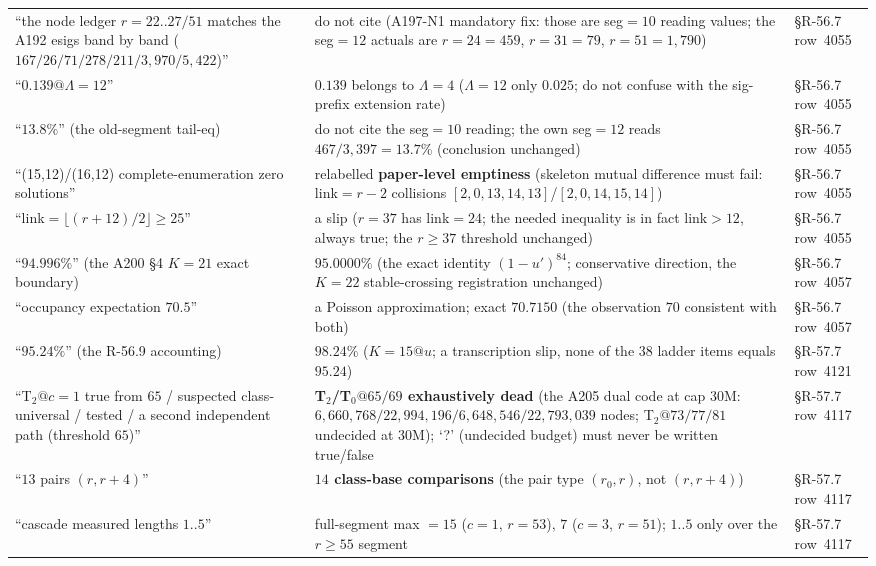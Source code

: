 \begin{longtable}{p{}p{}p{}}
``the node ledger $r=22..27/51$ matches the A192 esigs band by band ($167/26/71/278/211/3{,}970/5{,}422$)'' & do not cite (A197-N1 mandatory fix: those are seg$=10$ reading values; the seg$=12$ actuals are $r=24=$\textbf{$459$}, $r=31=$\textbf{$79$}, $r=51=$\textbf{$1{,}790$}) & \S R-56.7 row~4055 \\
``$0.139@\Lambda=12$'' & $0.139$ belongs to \textbf{$\Lambda=4$} ($\Lambda=12$ only $0.025$; do not confuse with the sig-prefix extension rate) & \S R-56.7 row~4055 \\
``$13.8\%$'' (the old-segment tail-eq) & do not cite the seg$=10$ reading; the own seg$=12$ reads \textbf{$467/3{,}397=13.7\%$} (conclusion unchanged) & \S R-56.7 row~4055 \\
``(15,12)/(16,12) complete-enumeration zero solutions'' & relabelled \textbf{paper-level emptiness} (skeleton mutual difference must fail: link$=r-2$ collisions $[2,0,13,14,13]$/$[2,0,14,15,14]$) & \S R-56.7 row~4055 \\
``link$=\lfloor(r+12)/2\rfloor\ge25$'' & a slip ($r=37$ has link$=$\textbf{$24$}; the needed inequality is in fact link$>12$, always true; the $r\ge37$ threshold unchanged) & \S R-56.7 row~4055 \\
``$94.996\%$'' (the A200 \S4 $K=21$ exact boundary) & \textbf{$95.0000\%$} (the exact identity $(1-u')^{84}$; conservative direction, the $K=22$ stable-crossing registration unchanged) & \S R-56.7 row~4057 \\
``occupancy expectation $70.5$'' & a Poisson approximation; exact \textbf{$70.7150$} (the observation $70$ consistent with both) & \S R-56.7 row~4057 \\
``$95.24\%$'' (the R-56.9 accounting) & \textbf{$98.24\%$} ($K=15@u$; a transcription slip, none of the $38$ ladder items equals $95.24$) & \S R-57.7 row~4121 \\
``T$_2@c=1$ true from $65$ / suspected class-universal / tested / a second independent path (threshold $65$)'' & \textbf{T$_2$/T$_0@65/69$ exhaustively dead} (the A205 dual code at cap 30M: $6{,}660{,}768/22{,}994{,}196/6{,}648{,}546/22{,}793{,}039$ nodes; T$_2@73/77/81$ undecided at 30M); `?' (undecided budget) must never be written true/false & \S R-57.7 row~4117 \\
``$13$ pairs $(r,r+4)$'' & \textbf{$14$ class-base comparisons} (the pair type $(r_0,r)$, not $(r,r+4)$) & \S R-57.7 row~4117 \\
``cascade measured lengths $1..5$'' & full-segment max $=$\textbf{$15$} ($c=1$, $r=53$), $7$ ($c=3$, $r=51$); $1..5$ only over the $r\ge55$ segment & \S R-57.7 row~4117 \\

\end{longtable}
